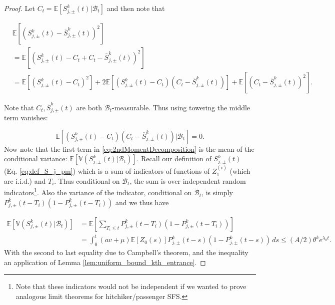 \documentclass{article}
\numberwithin{equation}{section}
\begin{document}
\begin{proof}
Let $C_t=\mathbb{E}[S_{j,\pm}^k(t)|\mathcal{B}_t]$ and then note that

\begin{align}\label{eq:2ndMomentDecomposition}
    &\mathbb{E}\left[\left(S_{j,\pm}^{k}(t)-\overline{S}_{j,\pm}^{k}(t)\right)^2\right]\nonumber\\
    &=\mathbb{E}\left[\left(S_{j,\pm}^{k}(t)-C_t+C_t-\overline{S}_{j,\pm}^{k}(t)\right)^2\right]\nonumber\\
    &=\mathbb{E}\left[\left(S_{j,\pm}^{k}(t)-C_t\right)^2\right]+2\mathbb{E}\left[\left(S_{j,\pm}^{k}(t)-C_t\right)\left(C_t-\overline{S}_{j,\pm}^{k}(t)\right)\right]+\mathbb{E}\left[\left(C_t-\overline{S}_{j,\pm}^{k}(t)\right)^2\right].
\end{align}

Note that $C_t,\overline{S}_{j,\pm}^{k}(t)$ are both $\mathcal{B}_t$-measurable. Thus using towering the middle term vanishes:

\[\mathbb{E}\left[\left(S_{j,\pm}^{k}(t)-C_t\right)\left(C_t-\overline{S}_{j,\pm}^{k}(t)\right)|\mathcal{B}_t\right]=0.\]
Now note that the first term in \eqref{eq:2ndMomentDecomposition} is the mean of the conditional variance: $\mathbb{E}\left[\mathbb{V}\left(S_{j,\pm}^{k}(t)|\mathcal{B}_t\right)\right].$
Recall our definition of $S_{j,\pm}^{k}(t)$ (Eq. \ref{eq:def_S_j_pm}) which is a sum of indicators of functions of $Z_1^{(i)}$ (which are i.i.d.) and $T_i$. Thus conditional on $\mathcal{B}_t$, the sum is over independent random indicators\footnote{Note that these indicators would not be independent if we wanted to prove analogous limit theorems for hitchiker/passenger SFS.}. Also the variance of the indicator, conditional on $\mathcal{B}_t$, is simply $P_{j,\pm}^{k}(t-T_i)(1-P_{j,\pm}^{k}(t-T_i))$ and we thus have

\begin{align}
  \mathbb{E}\left[\mathbb{V}\left(S_{j,\pm}^{k}(t)|\mathcal{B}_t\right)\right]&=\mathbb{E}\left[\sum_{T_i\leq t} P_{j,\pm}^{k}(t-T_i)(1-P_{j,\pm}^{k}(t-T_i))\right]\nonumber\\
  &=\int_0^t (av+\mu)\mathbb{E}[Z_0(s)]P_{j,\pm}^{k}(t-s)(1-P_{j,\pm}^{k}(t-s))\,ds\leq (A/2)\theta^k e^{\lambda_0 t}.\label{eq:L2_S_to_C}
\end{align}
With the second to last equality due to Campbell's theorem, and the inequality an application of Lemma \eqref{lem:uniform_bound_kth_entrance}.


\end{proof}
\end{document}
